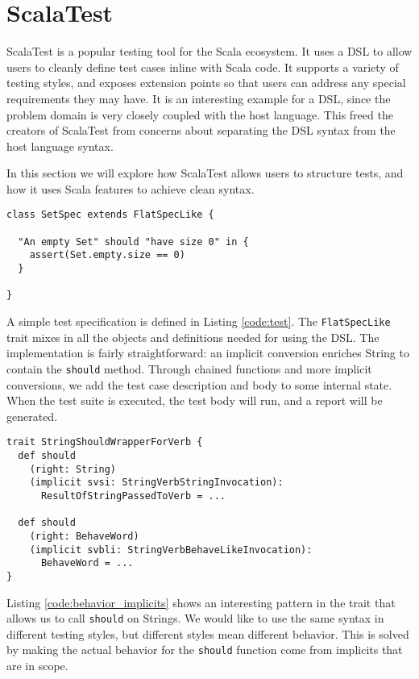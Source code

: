 \section{ScalaTest}

ScalaTest is a popular testing tool for the Scala ecosystem.
It uses a DSL to allow users to cleanly define test cases inline with Scala code.
It supports a variety of testing styles, and exposes extension points so that users can address any special requirements they may have.
It is an interesting example for a DSL, since the problem domain is very closely coupled with the host language.
This freed the creators of ScalaTest from concerns about separating the DSL syntax from the host language syntax.

In this section we will explore how ScalaTest allows users to structure tests, and how it uses Scala features to achieve clean syntax.

\begin{lstlisting}[caption=Simple test, label=code:test]
class SetSpec extends FlatSpecLike {

  "An empty Set" should "have size 0" in {
    assert(Set.empty.size == 0)
  }
	
}
\end{lstlisting}

A simple test specification is defined in Listing \ref{code:test}.
The \texttt{FlatSpecLike} trait mixes in all the objects and definitions needed for using the DSL.
The implementation is fairly straightforward: an implicit conversion enriches String to contain the \texttt{should} method.
Through chained functions and more implicit conversions, we add the test case description and body to some internal state.
When the test suite is executed, the test body will run, and a report will be generated.

\begin{lstlisting}[caption=Behavior from implicits, label=code:behavior_implicits, float]
trait StringShouldWrapperForVerb {
  def should
    (right: String)
    (implicit svsi: StringVerbStringInvocation):
      ResultOfStringPassedToVerb = ...
      
  def should
    (right: BehaveWord)
    (implicit svbli: StringVerbBehaveLikeInvocation):
      BehaveWord = ...
}
\end{lstlisting}

Listing \ref{code:behavior_implicits} shows an interesting pattern in the trait that allows us to call \texttt{should} on Strings.
We would like to use the same syntax in different testing styles, but different styles mean different behavior.
This is solved by making the actual behavior for the \texttt{should} function come from implicits that are in scope.

